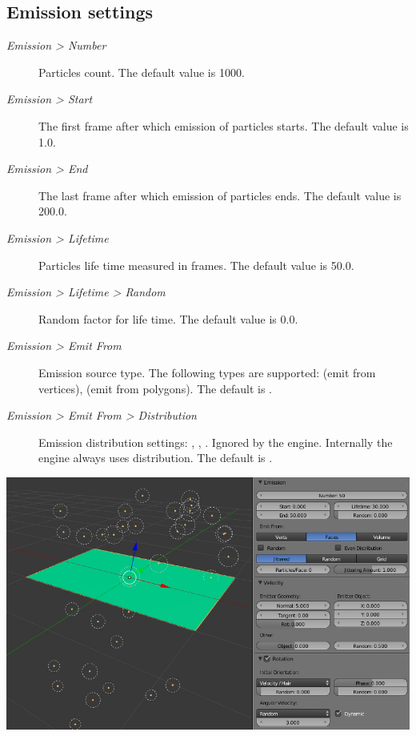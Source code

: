 \documentclass[a4paper,12pt,oneside]{sphinxmanual}
\begin{document}
\subsection{Emission settings}
\label{particles:id7}\begin{description}
\item[{\emph{Emission \textgreater{} Number}}] \leavevmode
Particles count. The default value is 1000.

\item[{\emph{Emission \textgreater{} Start}}] \leavevmode
The first frame after which emission of particles starts. The default value is 1.0.

\item[{\emph{Emission \textgreater{} End}}] \leavevmode
The last frame after which emission of particles ends. The default value is 200.0.

\item[{\emph{Emission \textgreater{} Lifetime}}] \leavevmode
Particles life time measured in frames. The default value is 50.0.

\item[{\emph{Emission \textgreater{} Lifetime \textgreater{} Random}}] \leavevmode
Random factor for life time. The default value is 0.0.

\item[{\emph{Emission \textgreater{} Emit From}}] \leavevmode
Emission source type. The following types are supported:  (emit from vertices),  (emit from polygons). The default is .

\item[{\emph{Emission \textgreater{} Emit From \textgreater{} Distribution}}] \leavevmode
Emission distribution settings: , , . Ignored by the engine. Internally the engine always uses  distribution. The default is .

\end{description}

{\hfill\includegraphics[width=1.000\linewidth]{particles_settings.jpg}\hfill}
\end{document}
